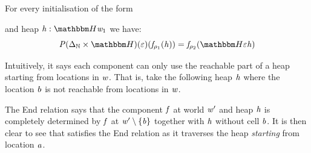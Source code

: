 For every initialisation of the form 
  and heap $\vh : \heapF\vw_1$
we have: \[\vP(\Delta_\nat\times\heapF)(\varepsilon)(\vf_{\rho_1}(\vh)) = \vf_{\rho_2}(\heapF\varepsilon\vh)\]

Intuitively, it says each component can only use the reachable part of a heap starting from locations in $\mathit{w}$.
That is, take the following heap $\mathit{h}$ where the location $\mathit{b}$ is not reachable from locations in $\mathit{w}$. 
\begin{center}
\end{center}

The End relation says that the component $\mathit{f}$ at world $\mathit{w}'$ and heap $\mathit{h}$ is completely determined by $\mathit{f}$ at $\mathit{w}' \setminus \{ \mathit{b} \}$ together with $\mathit{h}$ without cell $\mathit{b}$.
It is then clear to see that \countFun satisfies the End relation as it traverses the heap \emph{starting} from location $\mathit{a}$.

